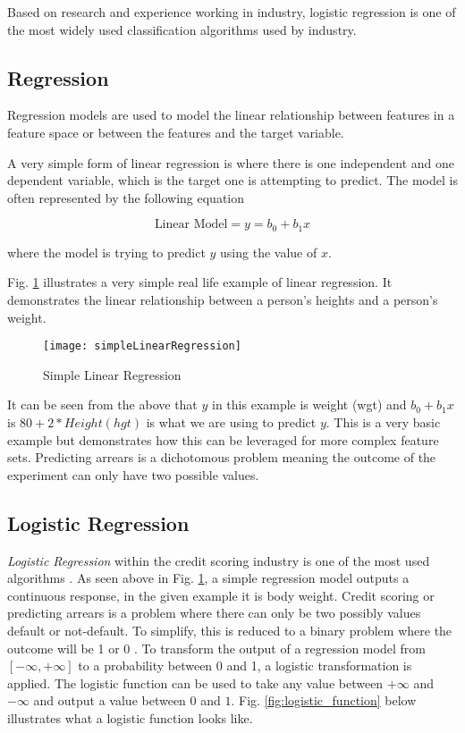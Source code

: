 Based on research and experience working in industry, logistic regression is one of the most widely used classification algorithms used by industry.

\subsection{Regression} \label{Reg}
Regression models are used to model the linear relationship between features in a feature space or between the features and the target variable.

A very simple form of linear regression is where there is one independent and one dependent variable, which is the target one is attempting to predict. The model is often represented by the following equation

\begin{equation} \label{eq:reg}
	\text{Linear Model} = y = b_0 + b_1x
\end{equation}

where the model is trying to predict $y$ using the value of $x$.

Fig. \ref{fig:simpleLinearRegression} illustrates a very simple real life example of linear regression. It demonstrates the linear relationship between a person's heights and a person's weight.

\begin{figure}[H]
	\texttt{[image: simpleLinearRegression]}
	\caption[Confusion Matrix]
	{Simple Linear Regression}
	\label{fig:simpleLinearRegression}
\end{figure}

It can be seen from the above that $y$ in this example is weight (wgt) and $b_0 + b_1x$ is $80 + 2*Height(hgt)$ is what we are using to predict $y$. This is a very basic example but demonstrates how this can be leveraged for more complex feature sets. Predicting arrears is a dichotomous problem meaning the outcome of the experiment can only have two possible values. 

\subsection{Logistic Regression} \label{LogReg}
\textit{Logistic Regression} \cite[See:][]{hosmer_applied_2000} within the credit scoring industry is one of the most used algorithms \citep{hand_evaluating_2010}. As seen above in Fig. \ref{fig:simpleLinearRegression}, a simple regression model outputs a continuous response, in the given example it is body weight. Credit scoring or predicting arrears is a problem where there can only be two possibly values default or not-default. To simplify, this is reduced to a binary problem where the outcome will be 1 or 0 \citep{zou_modified_2004}. To transform the output of a regression model from $[-\infty, +\infty]$ to a probability between 0 and 1, a logistic transformation is applied. The logistic function can be used to take any value between $+\infty$ and $-\infty$ and output a value between $0$ and $1$. Fig. \ref{fig:logistic_function} below illustrates what a logistic function looks like.


